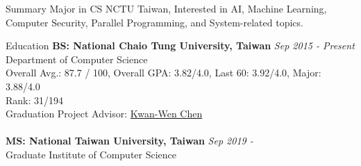 \documentclass{resume} %
\begin{document}
\begin{rSection}{Summary}
Major in CS NCTU Taiwan, Interested in AI, Machine Learning, Computer Security, Parallel Programming, and System-related topics.
\end{rSection}


\begin{rSection}{Education}
{\bf BS: National Chaio Tung University, Taiwan} \hfill {\em Sep 2015 - Present} 
\\ Department of Computer Science  
\\ Overall Avg.: 87.7 / 100, Overall GPA: 3.82/4.0, Last 60: 3.92/4.0, Major: 3.88/4.0
\\ Rank: 31/194
\\ Graduation Project Advisor: \href{https://www.cs.nctu.edu.tw/members/detail/kuanwen}{Kwan-Wen Chen} 
\\
\\
{\bf MS: National Taiwan University, Taiwan} \hfill {\em Sep 2019 - }
\\ Graduate Institute of Computer Science
\end{rSection}

\end{document}
